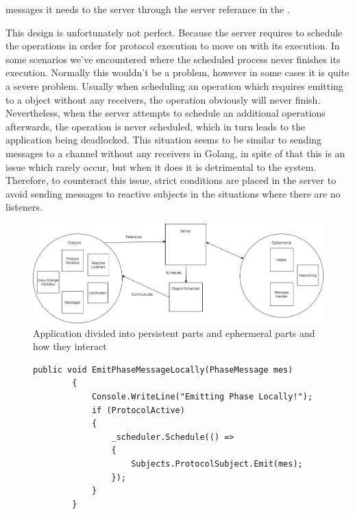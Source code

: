 messages it needs to the server through the server referance in the . 

This design is unfortunately not perfect. Because the server requires to schedule the operations in order for protocol execution to move on with its execution. In some scenarios we've encountered where the scheduled process never finishes its execution. Normally this wouldn't be a problem, however in some cases it is quite a severe problem. Usually when scheduling an operation which requires emitting to a  object without any receivers, the operation obviously will never finish. Nevertheless, when the server attempts to schedule an additional operations afterwards, the operation is never scheduled, which in turn leads to the application being deadlocked. This situation seems to be similar to sending messages to a channel without any receivers in Golang\cite{WEB:golangChannels}, in spite of that this is an issue which rarely occur, but when it does it is detrimental to the system. Therefore, to counteract this issue, strict conditions are placed in the server to avoid sending messages to reactive subjects in the situations where there are no listeners. %

\begin{figure}[H]
	\includegraphics[width=\linewidth]{figures/CleipnirStructure}
	\caption{Application divided into persistent parts and ephermeral parts and how they interact}
	\label{fig:PersistencyEphemeral}
\end{figure}

\begin{figure}[h]
	\centering
	\begin{lstlisting}[label = code:schedulerEmit, caption= Example of server and protocol interaction using Cleipnir scheduler, captionpos=b, basicstyle=\scriptsize]
	public void EmitPhaseMessageLocally(PhaseMessage mes)
        {
            Console.WriteLine("Emitting Phase Locally!");
            if (ProtocolActive)
            {
                _scheduler.Schedule(() =>
                {
                    Subjects.ProtocolSubject.Emit(mes);
                });    
            }
        }
	\end{lstlisting}
\end{figure}